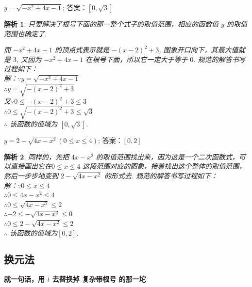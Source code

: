 \documentclass{article}
\theoremstyle{plain}
\newtheorem{aly}{解析}
\begin{document}
 $y=\sqrt{-x^2+4x-1}$; \hspace{25pt} 答案：$[0,\sqrt{3}]$

\begin{aly}
  只要解决了根号下面的那一整个式子的取值范围，相应的函数值 $y$ 的取值范围也确定了.

  而 $-x^2+4x-1$ 的顶点式表示就是 $-(x-2)^2+3$, 图象开口向下，其最大值就是 $3$, 又因为 $-x^2+4x-1$ 在根号下面，所以它一定大于等于 $0$. 规范的解答书写过程如下：\\
  解：$\because y=\sqrt{-x^2+4x-1}$\\
  $\therefore y=\sqrt{-(x-2)^2+3}$\\
  又$\because 0 \leqslant -(x-2)^2+3 \leqslant 3$\\
  $\therefore 0 \leqslant \sqrt{-(x-2)^2+3} \leqslant \sqrt{3}$\\
  $\therefore$ 该函数的值域为 $[0, \sqrt{3}]$.
\end{aly}

 $y=2-\sqrt{4x-x^2} (0 \leqslant x \leqslant 4)$; \hspace{25pt} 答案：$[0,2]$

\begin{aly}
  同样的，先把 $4x-x^2$ 的取值范围找出来，因为这是一个二次函数式，可以直接画出它在$0 \leqslant x \leqslant 4$ 这段范围对应的图象，接着找出这个整体的取值范围，然后一步步地变到 $2-\sqrt{4x-x^2}$ 的形式去. 规范的解答书写过程如下：\\
  解：$\because 0 \leqslant x \leqslant 4$\\
  $\therefore 0 \leqslant 4x-x^2 \leqslant 4$\\
  $\therefore 0 \leqslant \sqrt{4x-x^2} \leqslant 2$\\
  $\therefore -2 \leqslant -\sqrt{4x-x^2} \leqslant 0$\\
  $\therefore 0 \leqslant 2-\sqrt{4x-x^2} \leqslant 2$\\
  $\therefore$ 该函数的值域为$[0,2]$.
\end{aly}


\subsection{换元法}
\textbf{就一句话，用 $t$ 去替换掉 复杂带根号 的那一坨}
\end{document}
